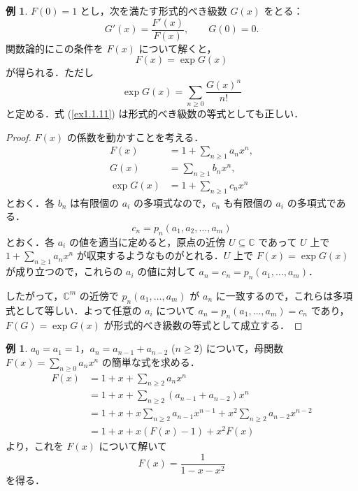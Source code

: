 \documentclass[xelatex,ja=standard,a4paper,14pt]{bxjsarticle}
\newcommand{\bbC}{\mathbb{C}}
\theoremstyle{definition}
\newtheorem{example}[theorem]{例}
\begin{document}
\begin{example}
    $F(0) = 1$ とし，次を満たす形式的べき級数 $G(x)$ をとる： \begin{equation*}
        G'(x) = \frac{F'(x)}{F(x)}, \qquad G(0) = 0.
    \end{equation*}
    関数論的にこの条件を $F(x)$ について解くと， \begin{equation} \label{ex1.1.11}
        F(x) = \exp G(x)
    \end{equation}
    が得られる．ただし \begin{equation*}
        \exp G(x) = \sum_{n \geq 0} \frac{G(x)^n}{n!}
    \end{equation*}
    と定める．式 (\ref{ex1.1.11}) は形式的べき級数の等式としても正しい．
\end{example}

\begin{proof}
    $F(x)$ の係数を動かすことを考える． \begin{align*}
        F(x)      & = 1 + \sum_{n \geq 1} a_n x^n, \\
        G(x)      & = \sum_{n \geq 1} b_n x^n,     \\
        \exp G(x) & = 1 + \sum_{n \geq 1} c_n x^n
    \end{align*}
    とおく．各 $b_n$ は有限個の $a_i$ の多項式なので，$c_n$ も有限個の $a_i$ の多項式である． \begin{equation*}
        c_n = p_n(a_1, a_2, \ldots, a_m)
    \end{equation*}
    とおく．各 $a_i$ の値を適当に定めると，原点の近傍 $U \subseteq \bbC$ であって $U$ 上で$1 + \sum_{n \geq 1} a_n x^n$ が収束するようなものがとれる．$U$ 上で $F(x) = \exp G(x)$ が成り立つので，これらの $a_i$ の値に対して $a_n = c_n = p_n(a_1,\ldots,a_m)$．

    したがって，$\bbC^m$ の近傍で $p_n(a_1,\ldots,a_m)$ が $a_n$ に一致するので，これらは多項式として等しい．よって任意の $a_i$ について $a_n = p_n(a_1,\ldots,a_m) = c_n$ であり，$F(G) = \exp G(x)$ が形式的べき級数の等式として成立する．
\end{proof}

\begin{example}
    $a_0 = a_1 = 1$，$a_n = a_{n-1} + a_{n-2}$ ($n \geq 2$) について，母関数 $F(x) = \sum_{n \geq 0} a_n x^n$ の簡単な式を求める． \begin{align*}
        F(x) & = 1 + x + \sum_{n \geq 2} a_n x^n                 \\
             & = 1 + x + \sum_{n \geq 2} (a_{n-1} + a_{n-2}) x^n \\
             & = 1 + x + x \sum_{n \geq 2} a_{n-1} x^{n-1}
        + x^2 \sum_{n \geq 2} a_{n-2} x^{n-2}                    \\
             & = 1 + x + x (F(x) - 1) + x^2 F(x)
    \end{align*}
    より，これを $F(x)$ について解いて \begin{equation*}
        F(x) = \frac{1}{1-x-x^2}
    \end{equation*}
    を得る．
\end{example}
\end{document}
